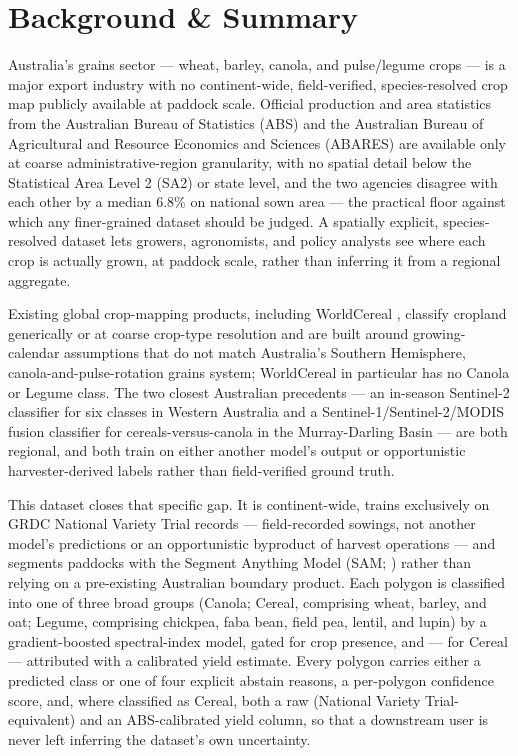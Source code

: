 
\section*{Background \& Summary}\label{background-summary}

Australia's grains sector --- wheat, barley, canola, and pulse/legume crops --- is a major export industry with no continent-wide, field-verified, species-resolved crop map publicly available at paddock scale. Official production and area statistics from the Australian Bureau of Statistics (ABS) and the Australian Bureau of Agricultural and Resource Economics and Sciences (ABARES) are available only at coarse administrative-region granularity, with no spatial detail below the Statistical Area Level 2 (SA2) or state level, and the two agencies disagree with each other by a median 6.8\% on national sown area --- the practical floor against which any finer-grained dataset should be judged. A spatially explicit, species-resolved dataset lets growers, agronomists, and policy analysts see where each crop is actually grown, at paddock scale, rather than inferring it from a regional aggregate.

Existing global crop-mapping products, including WorldCereal \citep{vantricht2023worldcereal}, classify cropland generically or at coarse crop-type resolution and are built around growing-calendar assumptions that do not match Australia's Southern Hemisphere, canola-and-pulse-rotation grains system; WorldCereal in particular has no Canola or Legume class. The two closest Australian precedents --- an in-season Sentinel-2 classifier for six classes in Western Australia \citep{sharma2026wa} and a Sentinel-1/Sentinel-2/MODIS fusion classifier for cereals-versus-canola in the Murray-Darling Basin \citep{alshammari2024mdb} --- are both regional, and both train on either another model's output or opportunistic harvester-derived labels rather than field-verified ground truth.

This dataset closes that specific gap. It is continent-wide, trains exclusively on GRDC National Variety Trial records --- field-recorded sowings, not another model's predictions or an opportunistic byproduct of harvest operations --- and segments paddocks with the Segment Anything Model (SAM; \citealp{kirillov2023sam}) rather than relying on a pre-existing Australian boundary product. Each polygon is classified into one of three broad groups (Canola; Cereal, comprising wheat, barley, and oat; Legume, comprising chickpea, faba bean, field pea, lentil, and lupin) by a gradient-boosted spectral-index model, gated for crop presence, and --- for Cereal --- attributed with a calibrated yield estimate. Every polygon carries either a predicted class or one of four explicit abstain reasons, a per-polygon confidence score, and, where classified as Cereal, both a raw (National Variety Trial-equivalent) and an ABS-calibrated yield column, so that a downstream user is never left inferring the dataset's own uncertainty.

